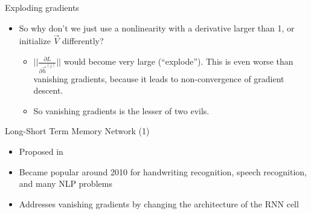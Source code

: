 
\begin{vbframe}{Exploding gradients}

\vfill

\begin{itemize}
	\item So why don't we just use a nonlinearity with a derivative larger than 1, or initialize $\vec V$ differently?
		\begin{itemize}
			\item $||\frac{\partial L}{\partial \vec h^{(j)}}||$ would become very large (``explode''). This is even worse than vanishing gradients, because it leads to non-convergence of gradient descent.
			\item So vanishing gradients is the lesser of two evils.
		\end{itemize}
\end{itemize}

\vfill

\end{vbframe}


\begin{vbframe}{Long-Short Term Memory Network (1)}

\vfill

\begin{itemize}
	\item Proposed in 
	\item Became popular around 2010 for handwriting recognition, speech recognition, and many NLP problems
	\item Addresses vanishing gradients by changing the architecture of the RNN cell
\end{itemize}

\vfill

\end{vbframe}


